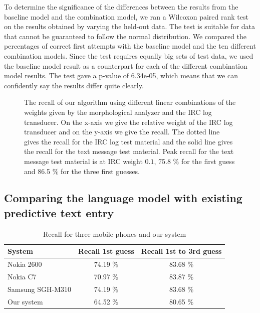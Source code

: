 \documentclass[a4paper,conference]{IEEEtran}
\begin{document}
To determine the significance of the differences between the results
from the baseline model and the combination model, we ran a Wilcoxon
paired rank test on the results obtained by varying the held-out
data. The test is suitable for data that cannot be guaranteed to
follow the normal distribution. We compared the percentages of correct
first attempts with the baseline model and the ten different
combination models. Since the test requires equally big sets of test
data, we used the baseline model result as a counterpart for each of
the different combination model results. The test gave a p-value of
6.34e-05, which means that we can confidently say the results
differ quite clearly.

\begin{figure}[!t]
\centerline{
\hfil
{}}
\caption{The recall of our algorithm using different linear combinations of the weights given by the morphological analyzer and the IRC log transducer. On the x-axis we give the relative weight of the IRC log transducer and on the y-axis we give the recall. The dotted line gives the recall for the IRC log test material and the solid line gives the recall for the text message test material. Peak recall for the text message test material is at IRC weight $0.1$, 75.8 \% for the first guess and 86.5 \% for the three first guesses.}
\label{fig:AccuraciesIRCMaterial}
\end{figure}

\subsection{Comparing the language model with existing predictive text entry}

\begin{table}[!t]
\begin{center}
\caption{Recall for three mobile phones and our system}
\label{tab:phones}
\begin{tabular} {l c c}
System & Recall 1st guess & Recall 1st to 3rd guess\\
\hline
Nokia 2600 \rule{0pt}{2.6ex}  & 74.19 \%          & 83.68 \%\\
Nokia C7     & 70.97 \%          & 83.87 \%\\
Samsung SGH-M310 & 74.19 \%      & 83.68 \%\\
Our system & 64.52 \% & 80.65 \%  \\
\hline
\end{tabular}
\end{center}
\end{table}
\end{document}

